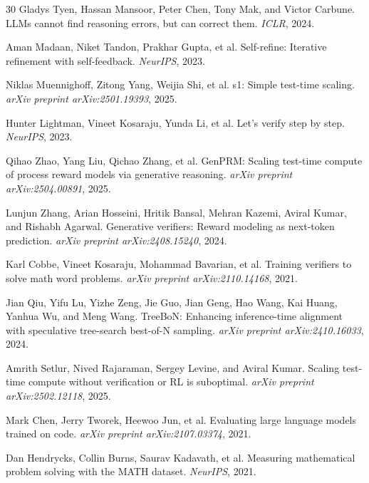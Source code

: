 \documentclass{article}
\begin{document}
\begin{thebibliography}{30}
Gladys Tyen, Hassan Mansoor, Peter Chen, Tony Mak, and Victor Carbune.
\newblock LLMs cannot find reasoning errors, but can correct them.
\newblock \emph{ICLR}, 2024.

Aman Madaan, Niket Tandon, Prakhar Gupta, et al.
\newblock Self-refine: Iterative refinement with self-feedback.
\newblock \emph{NeurIPS}, 2023.

Niklas Muennighoff, Zitong Yang, Weijia Shi, et al.
\newblock s1: Simple test-time scaling.
\newblock \emph{arXiv preprint arXiv:2501.19393}, 2025.

Hunter Lightman, Vineet Kosaraju, Yunda Li, et al.
\newblock Let's verify step by step.
\newblock \emph{NeurIPS}, 2023.

Qihao Zhao, Yang Liu, Qichao Zhang, et al.
\newblock GenPRM: Scaling test-time compute of process reward models via generative reasoning.
\newblock \emph{arXiv preprint arXiv:2504.00891}, 2025.

Lunjun Zhang, Arian Hosseini, Hritik Bansal, Mehran Kazemi, Aviral Kumar, and Rishabh Agarwal.
\newblock Generative verifiers: Reward modeling as next-token prediction.
\newblock \emph{arXiv preprint arXiv:2408.15240}, 2024.

Karl Cobbe, Vineet Kosaraju, Mohammad Bavarian, et al.
\newblock Training verifiers to solve math word problems.
\newblock \emph{arXiv preprint arXiv:2110.14168}, 2021.

Jian Qiu, Yifu Lu, Yizhe Zeng, Jie Guo, Jian Geng, Hao Wang, Kai Huang, Yanhua Wu, and Meng Wang.
\newblock TreeBoN: Enhancing inference-time alignment with speculative tree-search best-of-N sampling.
\newblock \emph{arXiv preprint arXiv:2410.16033}, 2024.

Amrith Setlur, Nived Rajaraman, Sergey Levine, and Aviral Kumar.
\newblock Scaling test-time compute without verification or RL is suboptimal.
\newblock \emph{arXiv preprint arXiv:2502.12118}, 2025.

Mark Chen, Jerry Tworek, Heewoo Jun, et al.
\newblock Evaluating large language models trained on code.
\newblock \emph{arXiv preprint arXiv:2107.03374}, 2021.

Dan Hendrycks, Collin Burns, Saurav Kadavath, et al.
\newblock Measuring mathematical problem solving with the MATH dataset.
\newblock \emph{NeurIPS}, 2021.


\end{thebibliography}
\end{document}
